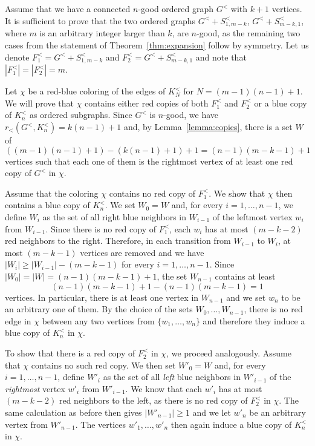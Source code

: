 \documentclass[11pt,a4paper]{article}
\theoremstyle{remark}
\begin{document}
Assume that we have a connected $n$-good ordered graph $G^<$ with $k+1$ vertices.
It is sufficient to prove that the two ordered graphs $G^< + S^<_{1,m-k}$, $G^< + S^<_{m-k,1}$, where $m$ is an arbitrary integer larger than $k$, are $n$-good, as the remaining two cases from the statement of Theorem~\ref{thm:expansion} follow by symmetry. 
Let us denote $F^<_1 = G^< + S^<_{1,m-k}$ and $F^<_2 = G^< + S^<_{m-k,1}$ and note that $|F^<_1|=|F^<_2|=m$. 

Let $\chi$ be a red-blue coloring of the edges of $K^<_N$ for $N=(m-1)(n-1)+1$.
We will prove that $\chi$ contains either red copies of both $F^<_1$ and $F^<_2$ or a blue copy of $K^<_n$ as ordered subgraphs.
Since $G^<$ is $n$-good, we have $r_<(G^<,K^<_n)=k(n-1)+1$ and, by Lemma~\ref{lemma:copies}, there is a set $W$ of 
\[((m-1)(n-1)+1) - (k(n-1) +1) +1=(n-1)(m-k-1)+1\]
vertices such that each one of them is the rightmost vertex of at least one red copy of $G^<$ in $\chi$.



Assume that the coloring $\chi$ contains no red copy of $F^<_1$.
We show that $\chi$ then contains a blue copy of $K^<_n$.
We set $W_0=W$ and, for every $i=1,\dots,n-1$, we define $W_i$ as the set of all right blue neighbors in $W_{i-1}$ of the leftmost vertex $w_i$ from $W_{i-1}$.
Since there is no red copy of $F^<_1$, each $w_i$ has at most $(m-k-2)$ red neighbors to the right.
Therefore, in each transition from $W_{i-1}$ to $W_i$, at most $(m-k-1)$ vertices are removed and we have $|W_i| \geq |W_{i-1}| - (m-k-1)$ for every $i=1,\dots,n-1$.
Since $|W_0|=|W|=(n-1)(m-k-1)+1$, the set $W_{n-1}$ contains at least
\[(n-1)(m-k-1)+1 - (n-1)(m-k-1) = 1\]
vertices.
In particular, there is at least one vertex in $W_{n-1}$ and we set $w_n$ to be an arbitrary one of them.
By the choice of the sets $W_0,\dots,W_{n-1}$, there is no red edge in $\chi$ between any two vertices from $\{w_1,\dots, w_n\}$ and therefore they induce a blue copy of $K^<_n$ in $\chi$.

To show that there is a red copy of $F^<_2$ in $\chi$, we proceed analogously.
Assume that $\chi$ contains no such red copy.
We then set $W'_0=W$ and, for every $i=1,\dots,n-1$, define $W'_i$ as the set of all \emph{left} blue neighbors in $W'_{i-1}$ of the \emph{rightmost} vertex $w'_i$ from $W'_{i-1}$. We know that each $w'_i$ has at most $(m-k-2)$ red neighbors to the left, as there is no red copy of $F^<_2$ in $\chi$.
The same calculation as before then gives $|W'_{n-1}|\geq 1$ and we let $w'_n$ be an arbitrary vertex from $W'_{n-1}$.
The vertices $w'_1, \dots, w'_n$ then again induce a blue copy of $K^<_n$  in $\chi$.
\end{document}
